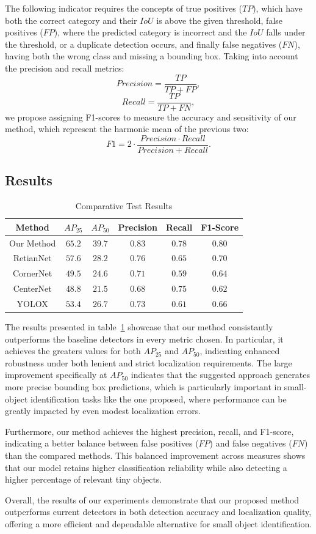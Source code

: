 The following indicator requires the concepts of true positives ($TP$), which
have both the correct category and their $IoU$ is above the given threshold,
false positives ($FP$), where the predicted category is incorrect and the $IoU$
falls under the threshold, or a duplicate detection occurs, and finally false
negatives ($FN$), having both the wrong class and missing a bounding box.
Taking into account the precision and recall metrics:
\[
	Precision = \frac{TP}{TP + FP},
\]
\[
	Recall = \frac{TP}{TP + FN},
\]
we propose assigning F1-scores to measure the accuracy and sensitivity of our
method, which represent the harmonic mean of the previous two:
\[
	F1 = 2 \cdot \frac{Precision \cdot Recall}{Precision + Recall}.
\]

\subsection{Results}

\begin{table}
\centering
	\begin{tabular}{|c|c|c|c|c|c|}
		\hline
		Method     & $AP_{25}$ & $AP_{50}$ & Precision & Recall & F1-Score \\
		\hline
		Our Method & $65.2$    & $39.7$    & $0.83$    & $0.78$ & $0.80$   \\
		\hline
		RetianNet  & $57.6$    & $28.2$    & $0.76$    & $0.65$ & $0.70$   \\
		\hline
		CornerNet  & $49.5$    & $24.6$    & $0.71$    & $0.59$ & $0.64$   \\
		\hline
		CenterNet  & $48.8$    & $21.5$    & $0.68$    & $0.75$ & $0.62$   \\
		\hline
		YOLOX      & $53.4$    & $26.7$    & $0.73$    & $0.61$ & $0.66$   \\
		\hline
	\end{tabular}
	\caption{Comparative Test Results}
	\label{table:results}
\end{table}

The results presented in table~\ref{table:results} showcase that our method
consistantly outperforms the baseline detectors in every metric chosen. In
particular, it achieves the greaters values for both $AP_{25}$ and $AP_{50}$,
indicating enhanced robustness under both lenient and strict localization
requirements. The large improvement specifically at $AP_{50}$ indicates that
the suggested approach generates more precise bounding box predictions, which
is particularly important in small-object identification tasks like the one
proposed, where performance can be greatly impacted by even modest localization
errors.

Furthermore, our method achieves the highest precision, recall, and F1-score,
indicating a better balance between false positives ($FP$) and false negatives
($FN$) than the compared methods. This balanced improvement across measures
shows that our model retains higher classification reliability while also
detecting a higher percentage of relevant tiny objects.

Overall, the results of our experiments demonstrate that our proposed method
outperforms current detectors in both detection accuracy and localization
quality, offering a more efficient and dependable alternative for small object
identification.